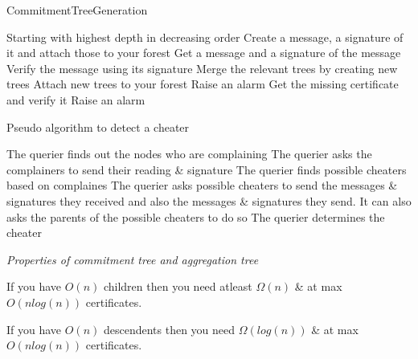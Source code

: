 \begin{algorithm}[H]\label{number3} \caption {CommitmentTreeGeneration}
	\begin {algorithmic}[1]
		\STATE Starting with highest depth in decreasing order 
				\STATE Create a message, a signature of it and attach those to your forest
									\STATE Get a message and a signature of the message
									\STATE Verify the message using its signature 
										\STATE Merge the relevant trees by creating new trees
										\STATE Attach new trees to your forest
									\ELSE
										\STATE Raise an alarm
									\ENDIF
								\ELSE
									\STATE Get the missing certificate and verify it
											\STATE Raise an alarm
									\ENDIF
								\ENDIF
							\ENDFOR
						\ENDFOR
					\ENDIF
			\ENDFOR
	\end{algorithmic}
\end{algorithm}

\begin{algorithm}
\caption{Pseudo algorithm to detect a cheater}
	\begin{algorithmic}[1]
			\STATE The querier finds out the nodes who are complaining 
			\STATE The querier asks the complainers to send their reading \& signature
			\STATE The querier finds possible cheaters based on complaines
			\STATE The querier asks possible cheaters to send the messages \& signatures they received and also the messages \& signatures they send. It can also asks the parents of the possible cheaters to do so
			\STATE The querier determines the cheater 
	\end{algorithmic}
\end{algorithm}

\textit{Properties of commitment tree and aggregation tree}

	If you have $O(n)$ children then you need atleast $\Omega(n)$ \& at max $O(nlog(n))$ certificates.

	If you have $O(n)$ descendents then you need $\Omega(log(n))$  \& at max $O(nlog(n))$ certificates.
